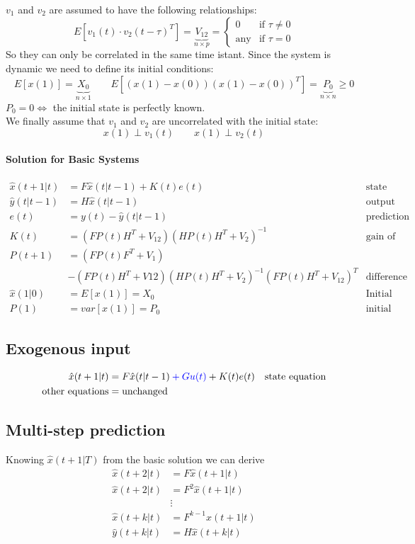 \documentclass{report}
\begin{document}
$v_1$ and $v_2$ are assumed to have the following relationships:
\[
E\left[v_1(t)\cdot v_2(t-\tau)^T\right]=
\underbrace{V_{12}}_{n \times p}=
\begin{cases}
0&\text{if }\tau\neq 0\\
\text{any}&\text{if }\tau=0
\end{cases}
\]
So they can only be correlated in the same time istant. Since the system is dynamic we need to define its initial conditions:
\[
E\left[x(1)\right]=\underbrace{X_0}_{n \times 1}
\qquad
E\left[(x(1)-x(0))(x(1)-x(0))^T\right]=\underbrace{P_0}_{n\times n}\geq 0
\]
$P_0=0 \iff$ the initial state is perfectly known.\\
We finally assume that $v_1$ and $v_2$ are uncorrelated with the initial state:
\[
x(1)\perp v_1(t) 
\qquad
x(1)\perp v_2(t)
\]
\paragraph{Solution for Basic Systems}
\begin{align*}
\hat{x}(t+1|t)&=F\hat{x}(t|t-1)+K(t)e(t)&\text{state equation}\\
\hat{y}(t|t-1)&=H\hat{x}(t|t-1)&\text{output equation}\\
e(t)&=y(t)-\hat{y}(t|t-1)&\text{prediction error}\\
K(t)&=\left(FP(t)H^T+V_{12}\right)\left(HP(t)H^T+V_2\right)^{-1}&\text{gain of the KF}\\
P(t+1)&=\left(FP(t)F^T+V_1\right)\\
&-\left(FP(t)H^T+V{12}\right)\left(HP(t)H^T+V_2\right)^{-1}\left(FP(t)H^T+V_{12}\right)^T&\text{difference Riccati equation}\\
\hline
\hat{x}(1|0)&=E\left[x(1)\right]=X_0&\text{Initial state}\\
P(1)&=var\left[x(1)\right]=P_0&\text{initial DRE}
\end{align*}

\subsection{Exogenous input}
\begin{align*}
\hat{x}(t+1|t)&=F\hat{x}(t|t-1)\color{blue}+Gu(t)\color{black}+K(t)e(t)&\text{state equation}\\
\text{other equations}&=\text{unchanged}
\end{align*}
\subsection{Multi-step prediction}
Knowing $\hat{x}(t+1|T)$ from the basic solution we can derive
\begin{align*}
\hat{x}(t+2|t)&=F\hat{x}(t+1|t)\\
\hat{x}(t+2|t)&=F^2\hat{x}(t+1|t)\\
&\vdots\\
\hat{x}(t+k|t)&=F^{k-1}\hat{x}(t+1|t)\\
\hline
\hat{y}(t+k|t)&=H\hat{x}(t+k|t)
\end{align*}
\end{document}
